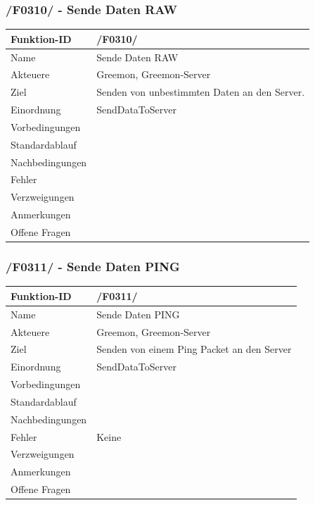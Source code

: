 \documentclass[pointlessnumbers]{scrartcl}
\begin{document}
 \subsubsection{/F0310/ - Sende Daten RAW}
 \begin{tabular}{|p{\BreiteErsterTab}|p{\BreiteZweiterTab}|}\hline
    Funktion-ID &       /F0310/  
                        \\ \hline
    Name &              Sende Daten RAW
                        \\ \hline
    Akteuere &          Greemon, Greemon-Server
                        \\ \hline
    Ziel &              Senden von unbestimmten Daten an den Server. 
                        \\ \hline
    Einordnung &        SendDataToServer 
                        \\ \hline
    Vorbedingungen &    
                        \\ \hline
    Standardablauf &    
                        \\ \hline
    Nachbedingungen &   
                        \\ \hline
    Fehler &       
                        \\ \hline
    Verzweigungen &     
                        \\ \hline
    Anmerkungen &       
                        \\ \hline
    Offene Fragen &     
                        \\ \hline
 \end{tabular} 
 
 \subsubsection{/F0311/ - Sende Daten PING}
 \begin{tabular}{|p{\BreiteErsterTab}|p{\BreiteZweiterTab}|}\hline
   Funktion-ID & /F0311/  \\ \hline
   Name & Sende Daten PING\\ \hline
   Akteuere & Greemon, Greemon-Server\\ \hline
   Ziel & Senden von einem Ping Packet an den Server \\ \hline
    Einordnung & SendDataToServer \\ \hline
    Vorbedingungen &  \\ \hline
    Standardablauf & \\ \hline
    Nachbedingungen &  \\ \hline
    Fehler & Keine \\ \hline
    Verzweigungen &  \\ \hline
    Anmerkungen &  \\ \hline
    Offene Fragen & \\ \hline
 \end{tabular} 
 
\end{document}
